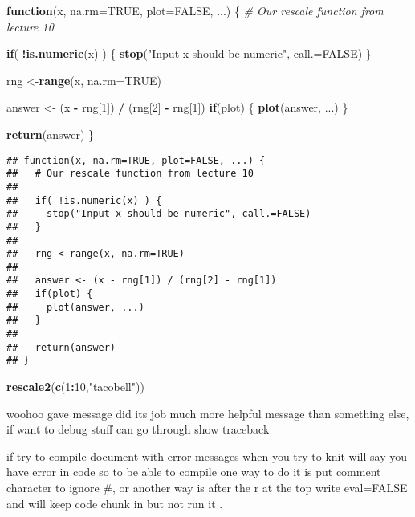 \documentclass[]{article}
\newenvironment{Shaded}{\begin{snugshade}}{\end{snugshade}}
\newcommand{\KeywordTok}[1]{\textcolor[rgb]{0.13,0.29,0.53}{\textbf{#1}}}
\newcommand{\DataTypeTok}[1]{\textcolor[rgb]{0.13,0.29,0.53}{#1}}
\newcommand{\DecValTok}[1]{\textcolor[rgb]{0.00,0.00,0.81}{#1}}
\newcommand{\StringTok}[1]{\textcolor[rgb]{0.31,0.60,0.02}{#1}}
\newcommand{\CommentTok}[1]{\textcolor[rgb]{0.56,0.35,0.01}{\textit{#1}}}
\newcommand{\OtherTok}[1]{\textcolor[rgb]{0.56,0.35,0.01}{#1}}
\newcommand{\ControlFlowTok}[1]{\textcolor[rgb]{0.13,0.29,0.53}{\textbf{#1}}}
\newcommand{\OperatorTok}[1]{\textcolor[rgb]{0.81,0.36,0.00}{\textbf{#1}}}
\newcommand{\NormalTok}[1]{#1}
\begin{document}
\begin{Shaded}
\begin{Highlighting}[]
\ControlFlowTok{function}\NormalTok{(x, }\DataTypeTok{na.rm=}\OtherTok{TRUE}\NormalTok{, }\DataTypeTok{plot=}\OtherTok{FALSE}\NormalTok{, ...) \{}
  \CommentTok{# Our rescale function from lecture 10}

  \ControlFlowTok{if}\NormalTok{( }\OperatorTok{!}\KeywordTok{is.numeric}\NormalTok{(x) ) \{}
    \KeywordTok{stop}\NormalTok{(}\StringTok{"Input x should be numeric"}\NormalTok{, }\DataTypeTok{call.=}\OtherTok{FALSE}\NormalTok{)}
\NormalTok{  \}}
  
\NormalTok{  rng <-}\KeywordTok{range}\NormalTok{(x, }\DataTypeTok{na.rm=}\OtherTok{TRUE}\NormalTok{)}

\NormalTok{  answer <-}\StringTok{ }\NormalTok{(x }\OperatorTok{-}\StringTok{ }\NormalTok{rng[}\DecValTok{1}\NormalTok{]) }\OperatorTok{/}\StringTok{ }\NormalTok{(rng[}\DecValTok{2}\NormalTok{] }\OperatorTok{-}\StringTok{ }\NormalTok{rng[}\DecValTok{1}\NormalTok{])}
  \ControlFlowTok{if}\NormalTok{(plot) \{ }
    \KeywordTok{plot}\NormalTok{(answer, ...) }
\NormalTok{  \}}

  \KeywordTok{return}\NormalTok{(answer)}
\NormalTok{\}}
\end{Highlighting}
\end{Shaded}

\begin{verbatim}
## function(x, na.rm=TRUE, plot=FALSE, ...) {
##   # Our rescale function from lecture 10
## 
##   if( !is.numeric(x) ) {
##     stop("Input x should be numeric", call.=FALSE)
##   }
##   
##   rng <-range(x, na.rm=TRUE)
## 
##   answer <- (x - rng[1]) / (rng[2] - rng[1])
##   if(plot) { 
##     plot(answer, ...) 
##   }
## 
##   return(answer)
## }
\end{verbatim}

\begin{Shaded}
\begin{Highlighting}[]
\KeywordTok{rescale2}\NormalTok{(}\KeywordTok{c}\NormalTok{(}\DecValTok{1}\OperatorTok{:}\DecValTok{10}\NormalTok{,}\StringTok{"tacobell"}\NormalTok{))}
\end{Highlighting}
\end{Shaded}

woohoo gave message did its job much more helpful message than something
else, if want to debug stuff can go through show traceback

if try to compile document with error messages when you try to knit will
say you have error in code so to be able to compile one way to do it is
put comment character to ignore \#, or another way is after the r at the
top write eval=FALSE and will keep code chunk in but not run it .
\end{document}
